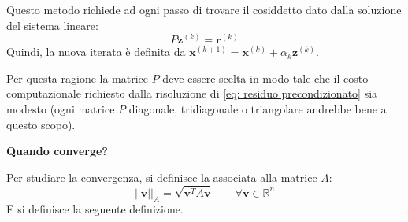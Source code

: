 \highspace
Questo metodo richiede ad ogni passo di trovare il cosiddetto  dato dalla soluzione del sistema lineare:
\begin{equation}\label{eq: residuo precondizionato}
    P\mathbf{z}^{\left(k\right)} = \mathbf{r}^{\left(k\right)}
\end{equation}
Quindi, la nuova iterata è definita da $\mathbf{x}^{\left(k+1\right)} = \mathbf{x}^{\left(k\right)} + \alpha_{k}\mathbf{z}^{\left(k\right)}$.

Per questa ragione la matrice $P$ deve essere scelta in modo tale che il costo computazionale richiesto dalla risoluzione di \ref{eq: residuo precondizionato} sia modesto (ogni matrice $P$ diagonale, tridiagonale o triangolare andrebbe bene a questo scopo).

\newpage

\begin{flushleft}
    \textcolor{Green3}{ \textbf{Quando converge?}}
\end{flushleft}
Per studiare la convergenza, si definisce la  associata alla matrice $A$:
\begin{equation}
    \left|\left| \mathbf{v} \right|\right|_{A} = \sqrt{\mathbf{v}^{T} A \mathbf{v}} \hspace{2em} \forall\mathbf{v} \in \mathbb{R}^{n}
\end{equation}
E si definisce la seguente definizione.

